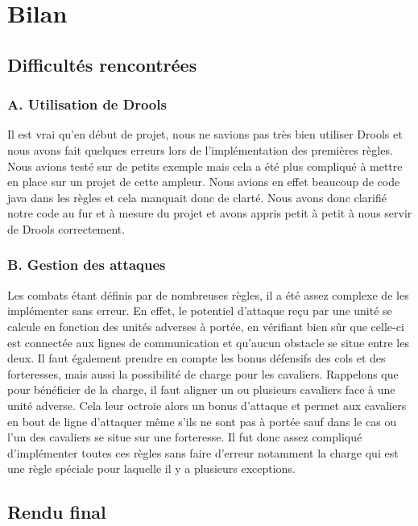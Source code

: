 \chapter{Bilan}

	\section{Difficultés rencontrées}   

		\subsection{A. Utilisation de Drools}
		Il est vrai qu'en début de projet, nous ne savions pas très bien utiliser Drools et nous avons fait quelques erreurs lors de l'implémentation des premières règles. 
		Nous avions testé sur de petits exemple mais cela a été plus compliqué à mettre en place sur un projet de cette ampleur. Nous avions en effet beaucoup de code java 
		dans les règles et cela manquait donc de clarté. Nous avons donc clarifié notre code au fur et à mesure du projet et avons appris petit à petit à nous servir de 
		Drools correctement. 
		
		\subsection{B. Gestion des attaques}
		Les combats étant définis par de nombreuses règles, il a été assez complexe de les implémenter sans erreur.
		En effet, le potentiel d'attaque reçu par une unité se calcule en fonction des unités adverses à portée, en vérifiant bien sûr que celle-ci est connectée aux lignes
		de communication et qu'aucun obstacle se situe entre les deux.
		Il faut également prendre en compte les bonus défensifs des cols et des forteresses, mais aussi la possibilité de charge pour les cavaliers.
		Rappelons que pour bénéficier de la charge, il faut aligner un ou plusieurs cavaliers face à une unité adverse.
		Cela leur octroie alors un bonus d'attaque et permet aux cavaliers en bout de ligne d'attaquer même s'ils ne sont pas à portée sauf dans le cas ou l'un des cavaliers
		se situe sur une forteresse.
		Il fut donc assez compliqué d'implémenter toutes ces règles sans faire d'erreur notamment la charge qui est une règle spéciale pour laquelle il y a
		plusieurs exceptions.
		
	\section{Rendu final}
	
